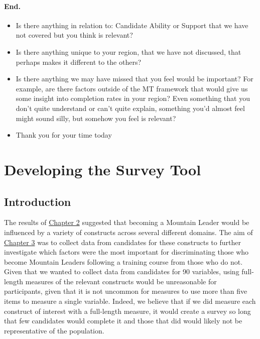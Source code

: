 \documentclass[
  12pt,
  a4paper,
]{book}
\providecommand{\tightlist}{%
  \setlength{\itemsep}{0pt}\setlength{\parskip}{0pt}}
\begin{document}
\hypertarget{end.-1}{%
\subsubsection{End.}\label{end.-1}}

\begin{itemize}
\tightlist
\item
  Is there anything in relation to: Candidate Ability or Support that we have not covered but you think is relevant?
\item
  Is there anything unique to your region, that we have not discussed, that perhaps makes it different to the others?
\item
  Is there anything we may have missed that you feel would be important? For example, are there factors outside of the MT framework that would give us some insight into completion rates in your region? Even something that you don't quite understand or can't quite explain, something you'd almost feel might sound silly, but somehow you feel is relevant?
\item
  Thank you for your time today
\end{itemize}

\hypertarget{survey-tool-dev}{%
\chapter{Developing the Survey Tool}\label{survey-tool-dev}}

\hypertarget{survey-tool-dev-intro}{%
\section{Introduction}\label{survey-tool-dev-intro}}

The results of \protect\hyperlink{ml-qualitative}{Chapter 2} suggested that becoming a Mountain Leader would be influenced by a variety of constructs across several different domains. The aim of \protect\hyperlink{ml-pra}{Chapter 3} was to collect data from candidates for these constructs to further investigate which factors were the most important for discriminating those who become Mountain Leaders following a training course from those who do not. Given that we wanted to collect data from candidates for 90 variables, using full-length measures of the relevant constructs would be unreasonable for participants, given that it is not uncommon for measures to use more than five items to measure a single variable. Indeed, we believe that if we did measure each construct of interest with a full-length measure, it would create a survey so long that few candidates would complete it and those that did would likely not be representative of the population.
\end{document}

